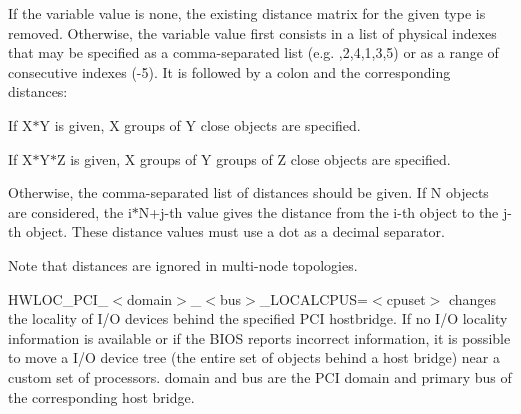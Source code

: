 \begin{DoxyDescription}
If the variable value is {\ttfamily none}, the existing distance matrix for the given type is removed. Otherwise, the variable value first consists in a list of physical indexes that may be specified as a comma-\/separated list (e.g. {,2,4,1,3,5}) or as a range of consecutive indexes ({-\/5}). It is followed by a colon and the corresponding distances: 
\begin{DoxyItemize}
\item If {\ttfamily X$\ast$Y} is given, X groups of Y close objects are specified. 
\item If {\ttfamily X$\ast$Y$\ast$Z} is given, X groups of Y groups of Z close objects are specified. 
\item Otherwise, the comma-\/separated list of distances should be given. If N objects are considered, the i$\ast$N+j-\/th value gives the distance from the i-\/th object to the j-\/th object. These distance values must use a dot as a decimal separator. 
\end{DoxyItemize}

Note that distances are ignored in multi-\/node topologies. 


\item[HWLOC\_\-PCI\_\-$<$domain$>$\_\-$<$bus$>$\_\-LOCALCPUS=$<$cpuset$>$ ]changes the locality of I/O devices behind the specified PCI hostbridge. If no I/O locality information is available or if the BIOS reports incorrect information, it is possible to move a I/O device tree (the entire set of objects behind a host bridge) near a custom set of processors. {\ttfamily domain} and {\ttfamily bus} are the PCI domain and primary bus of the corresponding host bridge. 


\end{DoxyDescription}